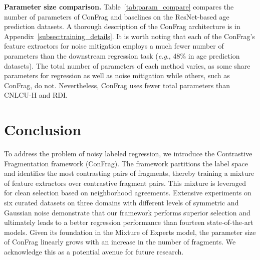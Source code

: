 \documentclass{article}
\def\eg{\textit{e.g}., } \def\Eg{\textit{E.g}., }
\theoremstyle{plain}
\theoremstyle{definition}
\theoremstyle{remark}
\begin{document}
\textbf{Parameter size comparison.}
Table~\ref{tab:param_compare} compares the number of parameters of ConFrag and baselines on the ResNet-based age prediction datasets. %
A thorough description of the ConFrag architecture is in Appendix~\ref{subsec:training_details}.
It is worth noting that each of the ConFrag's feature extractors for noise mitigation employs a much fewer number of parameters than the downstream regression task (\eg 48\% in age prediction datasets). %
The total number of parameters of each method varies, as some share parameters for regression as well as noise mitigation while others, such as ConFrag, do not.
Nevertheless, ConFrag uses fewer total parameters than CNLCU-H and RDI.


\section{Conclusion}\label{sec:conclusion}
\vskip -0.05in
To address the problem of noisy labeled regression, we introduce the Contrastive Fragmentation framework (ConFrag). 
The framework partitions the label space and identifies the most contrasting pairs of fragments, thereby training a mixture of feature extractors over contrastive fragment pairs.
This mixture is leveraged for clean selection based on neighborhood agreements.
Extensive experiments on six curated datasets on three domains with different levels of symmetric and Gaussian noise demonstrate that our framework performs superior selection and ultimately leads to a better regression performance than fourteen state-of-the-art models.
Given its foundation in the Mixture of Experts model, the parameter size of ConFrag linearly grows with an increase in the number of fragments. 
We acknowledge this as a potential avenue for future research.
\end{document}
